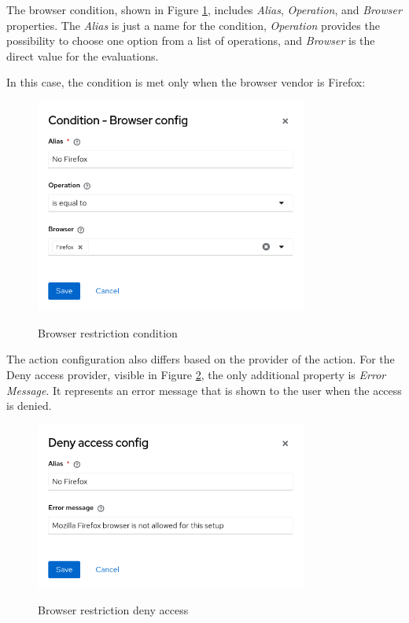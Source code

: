 The browser condition, shown in Figure \ref{fig:design-policy-browser-flow-condition}, includes \textit{Alias}, \textit{Operation}, and \textit{Browser} properties.
The \textit{Alias} is just a name for the condition, \textit{Operation} provides the possibility to choose one option from a list of operations, and \textit{Browser} is the direct value for the evaluations.

In this case, the condition is met only when the browser vendor is Firefox:

\begin{figure}[htbp]
  \centering
  \includegraphics[width=0.8\textwidth]{img/sections/5-design/policy-browser-condition.png}
  \label{fig:design-policy-browser-flow-condition}
  \caption{Browser restriction condition}
\end{figure}

The action configuration also differs based on the provider of the action.
For the Deny access provider, visible in Figure \ref{fig:design-policy-browser-flow-deny}, the only additional property is \textit{Error Message}.
It represents an error message that is shown to the user when the access is denied.

\begin{figure}[htbp]
  \centering
  \includegraphics[width=0.8\textwidth]{img/sections/5-design/policy-browser-deny.png}
  \label{fig:design-policy-browser-flow-deny}
  \caption{Browser restriction deny access}
\end{figure}

